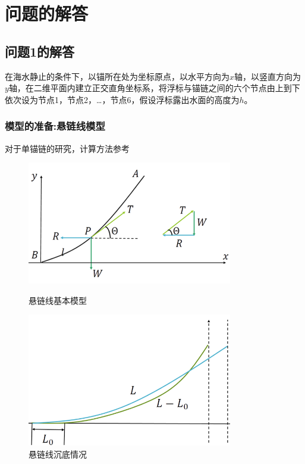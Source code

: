 \documentclass{cumcm}
\begin{document}
\section{问题的解答}
\subsection{问题1的解答}
在海水静止的条件下，以锚所在处为坐标原点，以水平方向为$x$轴，以竖直方向为$y$轴，在二维平面内建立正交直角坐标系，将浮标与锚链之间的六个节点由上到下依次设为节点1，节点2，\dots，节点6，假设浮标露出水面的高度为$h$。

\subsubsection{模型的准备:悬链线模型}\label{model}
对于单锚链的研究，计算方法参考\cite{seaStructure}\par 
\begin{figure}[h]
  \begin{minipage}[t]{0.5\linewidth}   
    \centering   
    \includegraphics[width=0.8\textwidth]{img/rope_strength.png}   
    \caption{悬链线基本模型}   
    \label{fig:rope_strength}   
  \end{minipage}   
   \begin{minipage}[t]{0.5\linewidth} %
      \centering   
      \includegraphics[width=0.8\textwidth]{img/rope_dif.png}   
      \caption{悬链线沉底情况}   
      \label{fig:rope_lying}   
    \end{minipage} 
\end{figure}
\end{document}
